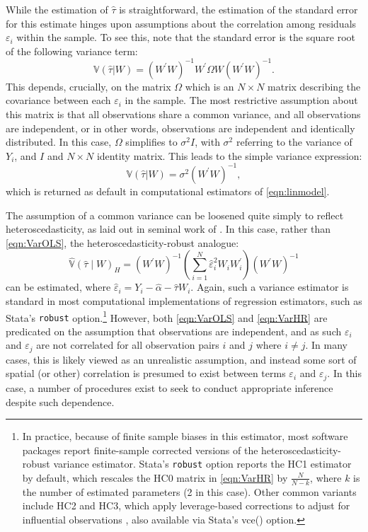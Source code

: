 \documentclass[varwidth,bib]{statapress}
\begin{document}
While the estimation of $\widehat\tau$ is straightforward, the estimation of the standard error for this estimate hinges upon assumptions about the correlation among residuals $\varepsilon_i$ within the sample.  To see this, note that the standard error is the square root of the following variance term:
\begin{equation}
\mathbb{V}(\widehat\tau|W)=(W^\prime W)^{-1}W^\prime\Omega W(W^\prime W)^{-1}.
\end{equation}
This depends, crucially, on the matrix $\Omega$ which is an $N\times N$ matrix describing the covariance between each $\varepsilon_i$ in the sample.  The most restrictive assumption about this matrix is that all observations share a common variance, and all observations are independent, or in other words, observations are independent and identically distributed.  In this case, $\Omega$ simplifies to $\sigma^2 I$, with $\sigma^2$ referring to the variance of $Y_i$, and $I$ and $N\times N$ identity matrix.  This leads to the simple variance expression:
\begin{equation}
\label{eqn:VarOLS}
\mathbb{V}(\widehat\tau|W)=\sigma^2(W^\prime W)^{-1},
\end{equation}
which is returned as default in computational estimators of \eqref{eqn:linmodel}.

The assumption of a common variance can be loosened quite simply to reflect heteroscedasticity, as laid out in seminal work of \citet{Huber1967,Eicker1967,white80}.  In this case, rather than \eqref{eqn:VarOLS}, the heteroscedasticity-robust analogue:
\begin{equation}
\label{eqn:VarHR}
\widehat{\mathbb{V}}(\widehat\tau \mid W)_H = (W^\prime W)^{-1} \left( \sum_{i=1}^N \widehat\varepsilon_i^2 W_i W_i^\prime \right) (W^\prime W)^{-1}
\end{equation}
can be estimated, where $\widehat\varepsilon_i=Y_i-\widehat\alpha-\widehat\tau W_i$.  Again, such a variance estimator is standard in most computational implementations of regression estimators, such as Stata's {\tt robust} option.\footnote{In practice, because of finite sample biases in this estimator, most software packages report finite-sample corrected versions of the heteroscedasticity-robust variance estimator. Stata's {\tt robust} option reports the HC1 estimator by default, which rescales the HC0 matrix in \eqref{eqn:VarHR} by $\tfrac{N}{N-k}$, where $k$ is the number of estimated parameters (2 in this case).  Other common variants include HC2 and HC3, which apply leverage-based corrections to adjust for influential observations \citep[see e.g.][]{MackinnonWhite1985,LongErwin2000}, also available via Stata's {vce()} option.}  However, both \eqref{eqn:VarOLS} and \eqref{eqn:VarHR} are predicated on the assumption that observations are independent, and as such $\varepsilon_i$ and $\varepsilon_j$ are not correlated for all observation pairs $i$ and $j$ where $i\neq j$.   In many cases, this is likely viewed as an unrealistic assumption, and instead some sort of spatial (or other) correlation is presumed to exist between terms $\varepsilon_i$ and $\varepsilon_j$.  In this case, a number of procedures exist to seek to conduct appropriate inference despite such dependence.
\end{document}
